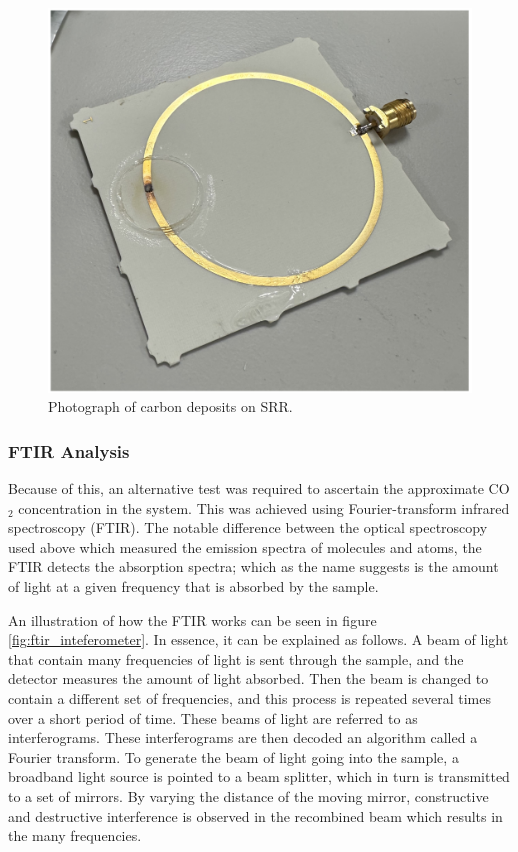 \begin{figure}[h!]
	\centering
	\includegraphics[width=0.75\linewidth]{chapter_4/figures/carbon_deposits_on_SRR.png}
	\caption{Photograph of carbon deposits on SRR.}
	\label{fig:carbon_deposits_on_SRR}
\end{figure}

\subsubsection{FTIR Analysis}

Because of this, an alternative test was required to ascertain the approximate CO$_2$ concentration in the system. This was achieved using Fourier-transform infrared spectroscopy (FTIR). The notable difference between the optical spectroscopy used above which measured the emission spectra of molecules and atoms, the FTIR detects the absorption spectra; which as the name suggests is the amount of light at a given frequency that is absorbed by the sample.

An illustration of how the FTIR works can be seen in figure \ref{fig:ftir_inteferometer}. In essence, it can be explained as follows. A beam of light that contain many frequencies of light is sent through the sample, and the detector measures the amount of light absorbed. Then the beam is changed to contain a different set of frequencies, and this process is repeated several times over a short period of time. These beams of light are referred to as interferograms. These interferograms are then decoded an algorithm called a  Fourier transform. To generate the beam of light going into the sample, a broadband light source is pointed to a beam splitter, which in turn is transmitted to a set of mirrors. By varying the distance of the moving mirror, constructive and destructive interference is observed in the recombined beam which results in the many frequencies.

